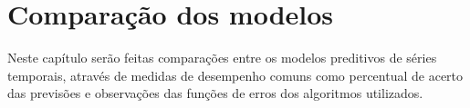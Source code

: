 
\chapter{Comparação dos modelos}
\label{cap:comparacao}

Neste capítulo serão feitas comparações entre os modelos preditivos de séries temporais, através de medidas de desempenho comuns como percentual de acerto das previsões e observações das funções de erros dos algoritmos utilizados.